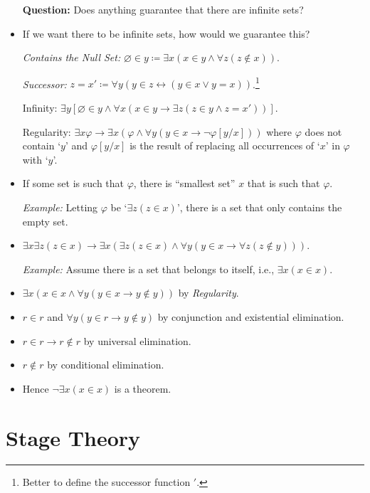\documentclass[a4paper, 11pt]{article} %
\begin{document}
  \begin{itemize}
    \item[\bf Question:] Does anything guarantee that there are infinite sets?
      \item If we want there to be infinite sets, how would we guarantee this?
    \item[\it Contains the Null Set:] $\varnothing \in y \coloneq \exists x(x \in y \wedge \forall z (z \notin x))$.
    \item[\it Successor:] $z = x'\coloneq \forall y(y \in z \leftrightarrow (y \in x \vee y = x))$.\footnote{Better to define the successor function $'$.}
    \item[\sc Infinity:] $\exists y[\varnothing \in y \wedge \forall x(x \in y \rightarrow \exists z (z \in y \wedge z = x'))]$.
    \item[\sc Regularity:] $\exists x \varphi \rightarrow \exists x (\varphi \wedge \forall y (y \in x \rightarrow \neg \varphi[y/x]))$ where $\varphi$ does not contain `$y$' and $\varphi[y/x]$ is the result of replacing all occurrences of `$x$' in $\varphi$ with `$y$'.
      \item If some set is such that $\varphi$, there is ``smallest set'' $x$ that is such that $\varphi$. %
    \item[\it Example:] Letting $\varphi$ be `$\exists z (z \in x)$', there is a set that only contains the empty set.
      \item $\exists x \exists z (z \in x) \rightarrow \exists x (\exists z (z \in x) \wedge \forall y (y \in x \rightarrow \forall z (z \notin y)))$.
    \item[\it Example:] Assume there is a set that belongs to itself, i.e., $\exists x (x \in x)$.
      \item $\exists x (x \in x \wedge \forall y (y \in x \rightarrow y \notin y))$ by \textit{Regularity}.
      \item $r \in r$ and $\forall y (y \in r \rightarrow y \notin y)$ by conjunction and existential elimination.
      \item $r \in r \rightarrow r \notin r$ by universal elimination.
      \item $r \notin r$ by conditional elimination. 
      \item Hence $\neg \exists x (x \in x)$ is a theorem.
  \end{itemize}




\section*{Stage Theory}
\end{document}
